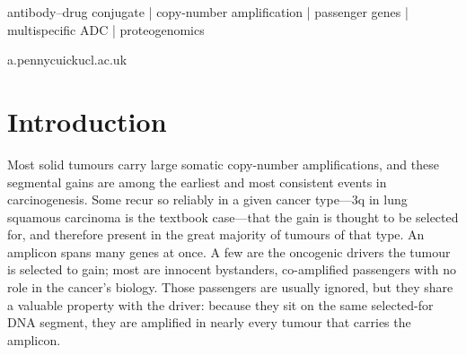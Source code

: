 \documentclass[times, twoside]{zHenriquesLab-StyleBioRxiv}
\begin{document}
\begin{abstract}
Observed transmissibility itself transfers strongly between the two lung subtypes ($\rho$ = 0.88) and remains positive across distant lineages, consistent with the shared cell-of-origin regulation the map implies. Single-cell co-detection is demonstrated wherever a malignant single-cell atlas exists (both lung subtypes and glioblastoma --- the latter entirely from prediction, using no GBM surface-abundance measurement); the remaining cohorts are nominated on the same genetic and topological evidence. The result is a pan-cancer, confidence-tiered catalogue of multi-antigen ADC co-target sets with a concrete plan to test them.
\end{abstract}

\begin{keywords}
antibody--drug conjugate | copy-number amplification | passenger genes | multispecific ADC | proteogenomics
\end{keywords}

\begin{corrauthor}
a.pennycuick\at ucl.ac.uk
\end{corrauthor}


\section*{Introduction}
Most solid tumours carry large somatic copy-number amplifications, and these segmental gains are among the earliest and most consistent events in carcinogenesis\cite{ref11,ref12,ref13}. Some recur so reliably in a given cancer type---3q in lung squamous carcinoma is the textbook case\cite{ref4,ref5}---that the gain is thought to be selected for, and therefore present in the great majority of tumours of that type. An amplicon spans many genes at once. A few are the oncogenic drivers the tumour is selected to gain; most are innocent bystanders, co-amplified passengers with no role in the cancer's biology. Those passengers are usually ignored, but they share a valuable property with the driver: because they sit on the same selected-for DNA segment, they are amplified in nearly every tumour that carries the amplicon.
\end{document}
